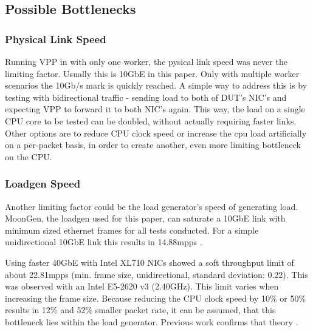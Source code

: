\subsection{Possible Bottlenecks}

\subsubsection{Physical Link Speed}
\label{sec:linkspeed}


Running VPP in with only one worker, the pysical link speed was never
the limiting factor. Usually this is 10GbE in this paper. Only with
multiple worker scenarios the 10Gb/s mark is quickly reached. A simple
way to address this is by testing with bidirectional traffic - sending
load to both of DUT's NIC's and expecting VPP to forward it to both
NIC's again. This way, the load on a single CPU core to be tested can
be doubled, without actually requiring faster links. Other options are
to reduce CPU clock speed or increase the cpu load artificially on a
per-packet basis, in order to create another, even more limiting
bottleneck on the CPU.


\subsubsection{Loadgen Speed}


Another limiting factor could be the load generator's speed of
generating load. MoonGen, the loadgen used for this paper, can
saturate a 10GbE link with minimum sized ethernet frames for all tests
conducted. For a simple unidirectional 10GbE link this results in
14.88mpps \cite{emmerich2015assessing}.


\label{sec:40gbelimit}

Using faster 40GbE with Intel XL710 NICs showed a soft throughput
limit of about 22.81mpps (min. frame size, unidirectional, standard
deviation: 0.22). This was observed with an Intel E5-2620 v3
(2.40GHz). This limit varies when increasing the frame size. Because
reducing the CPU clock speed by 10\% or 50\% results in 12\% and 52\%
smaller packet rate, it can be assumed, that this bottleneck lies
within the load generator. Previous work confirms that theory
\cite{emmerich2015moongen}. %

